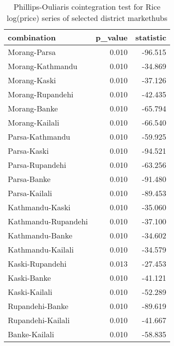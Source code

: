 \documentclass[
  12pt,
]{article}
\begin{document}
\begin{longtable}[t]{lrr}
\caption{\label{tab:pairwise-phillips-cointegration}Phillips-Ouliaris cointegration test for Rice log(price) series of selected district markethubs}\\
\toprule
combination & p\_value & statistic\\
\midrule
Morang-Parsa & 0.010 & -96.515\\
Morang-Kathmandu & 0.010 & -34.869\\
Morang-Kaski & 0.010 & -37.126\\
Morang-Rupandehi & 0.010 & -42.435\\
Morang-Banke & 0.010 & -65.794\\
\addlinespace
Morang-Kailali & 0.010 & -66.540\\
Parsa-Kathmandu & 0.010 & -59.925\\
Parsa-Kaski & 0.010 & -94.521\\
Parsa-Rupandehi & 0.010 & -63.256\\
Parsa-Banke & 0.010 & -91.480\\
\addlinespace
Parsa-Kailali & 0.010 & -89.453\\
Kathmandu-Kaski & 0.010 & -35.060\\
Kathmandu-Rupandehi & 0.010 & -37.100\\
Kathmandu-Banke & 0.010 & -34.602\\
Kathmandu-Kailali & 0.010 & -34.579\\
\addlinespace
Kaski-Rupandehi & 0.013 & -27.453\\
Kaski-Banke & 0.010 & -41.121\\
Kaski-Kailali & 0.010 & -52.289\\
Rupandehi-Banke & 0.010 & -89.619\\
Rupandehi-Kailali & 0.010 & -41.667\\
\addlinespace
Banke-Kailali & 0.010 & -58.835\\
\bottomrule
\end{longtable}
\end{document}
